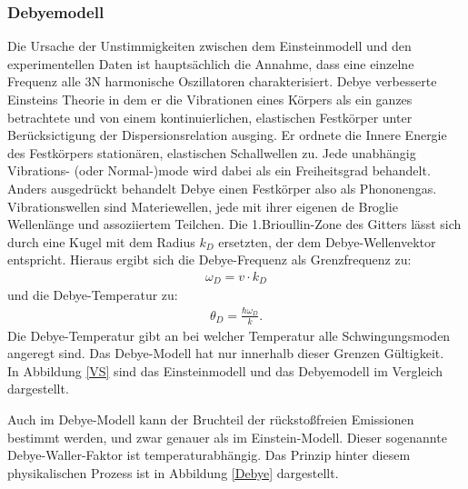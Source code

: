 \subsubsection{Debyemodell}

Die Ursache der Unstimmigkeiten zwischen dem Einsteinmodell und den experimentellen Daten ist hauptsächlich die Annahme, dass eine einzelne Frequenz alle 3N harmonische Oszillatoren charakterisiert. Debye verbesserte Einsteins Theorie in dem er die Vibrationen eines Körpers als ein ganzes betrachtete und von einem kontinuierlichen, elastischen Festkörper unter Berücksictigung der Dispersionsrelation ausging. Er ordnete die Innere Energie des Festkörpers stationären, elastischen Schallwellen zu. Jede unabhängig Vibrations- (oder Normal-)mode wird dabei als ein Freiheitsgrad behandelt.
Anders ausgedrückt behandelt Debye einen Festkörper also als Phononengas. Vibrationswellen sind Materiewellen, jede mit ihrer eigenen de Broglie Wellenlänge und assoziiertem Teilchen. 
Die 1.Brioullin-Zone des Gitters lässt sich durch eine Kugel mit dem  Radius  $k_D$ ersetzten, der dem Debye-Wellenvektor entspricht.  Hieraus ergibt sich die Debye-Frequenz als Grenzfrequenz zu:
\begin{align}
\omega_D = v\cdot k_D
\end{align}
und die Debye-Temperatur zu:
\begin{align}
\theta_D = \frac{\hbar\omega_D}{k}.
\end{align}
Die Debye-Temperatur gibt an bei welcher Temperatur alle Schwingungsmoden angeregt sind. Das Debye-Modell hat nur innerhalb dieser Grenzen Gültigkeit.\\
In Abbildung \ref{VS} sind das Einsteinmodell und das Debyemodell im Vergleich dargestellt.


Auch im Debye-Modell kann der Bruchteil der rückstoßfreien Emissionen bestimmt werden, und zwar genauer als im Einstein-Modell. Dieser sogenannte Debye-Waller-Faktor ist temperaturabhängig. Das Prinzip hinter diesem physikalischen Prozess ist in Abbildung \ref{Debye} dargestellt.


